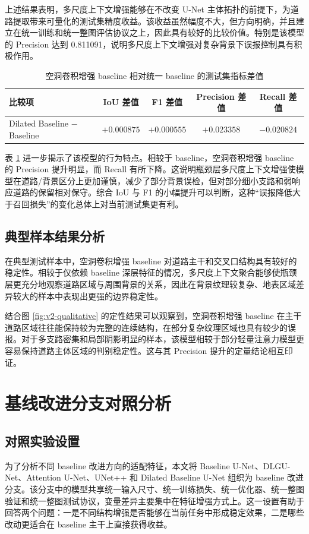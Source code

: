 上述结果表明，多尺度上下文增强能够在不改变 U-Net 主体拓扑的前提下，为道路提取带来可量化的测试集精度收益。该收益虽然幅度不大，但方向明确，并且建立在统一训练和统一整图评估协议之上，因此具有较好的比较价值。特别是该模型的 Precision 达到 0.811091，说明多尺度上下文增强对复杂背景下误报控制具有积极作用。

\begin{table}[htbp]
\centering
\caption{空洞卷积增强 baseline 相对统一 baseline 的测试集指标差值}
\label{tab:v2-dilated-delta}
\begin{tabular}{lcccc}
\toprule
比较项 & IoU 差值 & F1 差值 & Precision 差值 & Recall 差值 \\
\midrule
Dilated Baseline $-$ Baseline & $+0.000875$ & $+0.000555$ & $+0.023358$ & $-0.020824$ \\
\bottomrule
\end{tabular}
\end{table}

表 \ref{tab:v2-dilated-delta} 进一步揭示了该模型的行为特点。相较于 baseline，空洞卷积增强 baseline 的 Precision 提升明显，而 Recall 有所下降。这说明瓶颈层多尺度上下文增强使模型在道路/背景区分上更加谨慎，减少了部分背景误检，但对部分细小支路和弱响应道路的保留相对保守。综合 IoU 与 F1 的小幅提升可以判断，这种“误报降低大于召回损失”的变化总体上对当前测试集更有利。

\subsection{典型样本结果分析}
在典型测试样本中，空洞卷积增强 baseline 对道路主干和交叉口结构具有较好的稳定性。相较于仅依赖 baseline 深层特征的情况，多尺度上下文聚合能够使瓶颈层更充分地观察道路区域与周围背景的关系，因此在背景纹理较复杂、地表区域差异较大的样本中表现出更强的边界稳定性。

结合图 \ref{fig:v2-qualitative} 的定性结果可以观察到，空洞卷积增强 baseline 在主干道路区域往往能保持较为完整的连续结构，在部分复杂纹理区域也具有较少的误报。对于多支路密集和局部阴影明显的样本，该模型相较于部分轻量注意力模型更容易保持道路主体区域的判别稳定性。这与其 Precision 提升的定量结论相互印证。

\section{基线改进分支对照分析}
\subsection{对照实验设置}
为了分析不同 baseline 改进方向的适配特征，本文将 Baseline U-Net、DLGU-Net、Attention U-Net、UNet++ 和 Dilated Baseline U-Net 组织为 baseline 改进分支。该分支中的模型共享统一输入尺寸、统一训练损失、统一优化器、统一整图验证和统一整图测试协议，变量差异主要集中在特征增强方式上。这一设置有助于回答两个问题：一是不同结构增强是否能够在当前任务中形成稳定效果，二是哪些改动更适合在 baseline 主干上直接获得收益。

